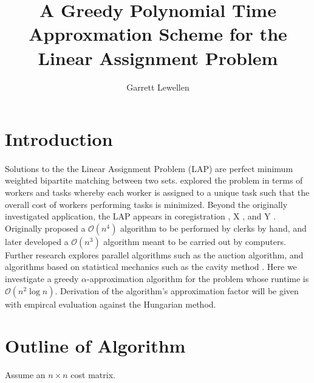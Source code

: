 \documentclass{article}
\newcommand{\boundedBy}[1]{\mathcal{O}\left(#1\right)}
\begin{document}
\author{Garrett Lewellen}
\title{A Greedy Polynomial Time Approxmation Scheme for the Linear Assignment Problem}

\maketitle

\section{Introduction}

\paragraph{} Solutions to the the Linear Assignment Problem (LAP) are perfect minimum weighted bipartite matching between two sets. \cite{} explored the problem in terms of workers and tasks whereby each worker is assigned to a unique task such that the overall cost of workers performing tasks is minimized. Beyond the originally investigated application, the LAP appears in coregistration \cite{},  X \cite{}, and Y \cite{}. \cite{} Originally proposed a $\boundedBy{n^4}$ algorithm to be performed by clerks by hand, and later \cite{} developed a $\boundedBy{n^3}$ algorithm meant to be carried out by computers. Further research explores parallel algorithms such as the auction algorithm, \cite{} and algorithms based on statistical mechanics such as the cavity method \cite{}. Here we investigate a greedy $\alpha$-approximation algorithm for the problem whose runtime is $\boundedBy{n^2 \log n}$. Derivation of the algorithm's approximation factor will be given with empircal evaluation against the Hungarian method.

\section{Outline of Algorithm}

Assume an $n \times n$ cost matrix.
\end{document}
